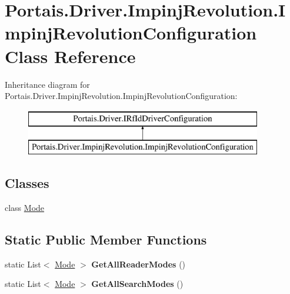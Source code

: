 \hypertarget{class_portais_1_1_driver_1_1_impinj_revolution_1_1_impinj_revolution_configuration}{}\section{Portais.\+Driver.\+Impinj\+Revolution.\+Impinj\+Revolution\+Configuration Class Reference}
\label{class_portais_1_1_driver_1_1_impinj_revolution_1_1_impinj_revolution_configuration}
Inheritance diagram for Portais.\+Driver.\+Impinj\+Revolution.\+Impinj\+Revolution\+Configuration\+:\begin{figure}[H]
\begin{center}
\leavevmode
\includegraphics[height=2.000000cm]{class_portais_1_1_driver_1_1_impinj_revolution_1_1_impinj_revolution_configuration}
\end{center}
\end{figure}
\subsection*{Classes}
\begin{DoxyCompactItemize}
\item 
class \hyperlink{class_portais_1_1_driver_1_1_impinj_revolution_1_1_impinj_revolution_configuration_1_1_mode}{Mode}
\end{DoxyCompactItemize}
\subsection*{Static Public Member Functions}
\begin{DoxyCompactItemize}
\item 
static List$<$ \hyperlink{class_portais_1_1_driver_1_1_impinj_revolution_1_1_impinj_revolution_configuration_1_1_mode}{Mode} $>$ {\bfseries Get\+All\+Reader\+Modes} ()\hypertarget{class_portais_1_1_driver_1_1_impinj_revolution_1_1_impinj_revolution_configuration_a6fb1f3e6bbfc851b0b7611cf385026fe}{}\label{class_portais_1_1_driver_1_1_impinj_revolution_1_1_impinj_revolution_configuration_a6fb1f3e6bbfc851b0b7611cf385026fe}

\item 
static List$<$ \hyperlink{class_portais_1_1_driver_1_1_impinj_revolution_1_1_impinj_revolution_configuration_1_1_mode}{Mode} $>$ {\bfseries Get\+All\+Search\+Modes} ()\hypertarget{class_portais_1_1_driver_1_1_impinj_revolution_1_1_impinj_revolution_configuration_a3f85c004c8124a0e563b051104bf43cc}{}\label{class_portais_1_1_driver_1_1_impinj_revolution_1_1_impinj_revolution_configuration_a3f85c004c8124a0e563b051104bf43cc}

\end{DoxyCompactItemize}

